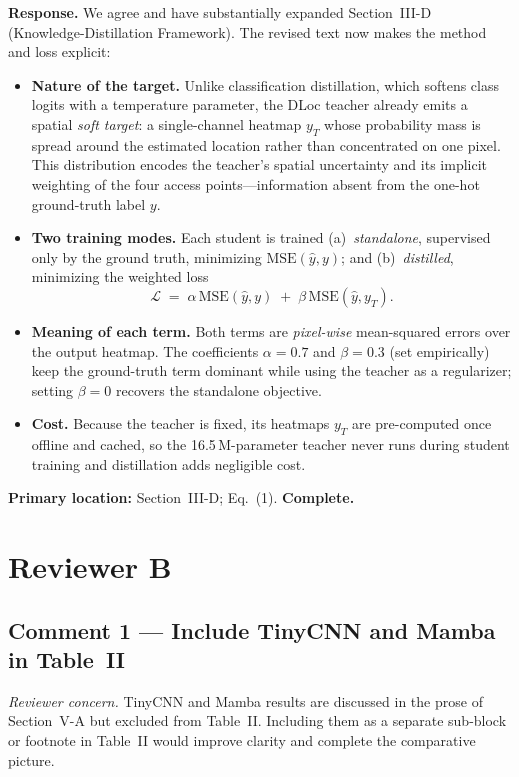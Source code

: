 \documentclass[11pt]{article}
\newcommand{\status}[1]{\textbf{\color{okgreen}#1}}
\newcommand{\concern}[1]{\textit{Reviewer concern.} #1}
\newcommand{\response}[1]{\textbf{Response.} #1}
\begin{document}
\response{We agree and have substantially expanded Section~III-D (Knowledge-Distillation Framework).} The revised text now makes the method and loss explicit:
\begin{itemize}[leftmargin=1.4em,itemsep=1pt,topsep=2pt]
  \item \textbf{Nature of the target.} Unlike classification distillation, which softens class logits with a temperature parameter, the DLoc teacher already emits a spatial \emph{soft target}: a single-channel heatmap $y_T$ whose probability mass is spread around the estimated location rather than concentrated on one pixel. This distribution encodes the teacher's spatial uncertainty and its implicit weighting of the four access points---information absent from the one-hot ground-truth label $y$.
  \item \textbf{Two training modes.} Each student is trained (a)~\emph{standalone}, supervised only by the ground truth, minimizing $\mathrm{MSE}(\hat{y},y)$; and (b)~\emph{distilled}, minimizing the weighted loss
  \[ \mathcal{L} \;=\; \alpha\,\mathrm{MSE}(\hat{y},y) \;+\; \beta\,\mathrm{MSE}(\hat{y},y_T). \]
  \item \textbf{Meaning of each term.} Both terms are \emph{pixel-wise} mean-squared errors over the output heatmap. The coefficients $\alpha{=}0.7$ and $\beta{=}0.3$ (set empirically) keep the ground-truth term dominant while using the teacher as a regularizer; setting $\beta{=}0$ recovers the standalone objective.
  \item \textbf{Cost.} Because the teacher is fixed, its heatmaps $y_T$ are pre-computed once offline and cached, so the 16.5\,M-parameter teacher never runs during student training and distillation adds negligible cost.
\end{itemize}
\textbf{Primary location:} Section~III-D; Eq.~(1). \hfill \status{Complete.}

\section{Reviewer B}

\subsection{Comment 1 --- Include TinyCNN and Mamba in Table~II}
\concern{TinyCNN and Mamba results are discussed in the prose of Section~V-A but excluded from Table~II. Including them as a separate sub-block or footnote in Table~II would improve clarity and complete the comparative picture.}
\end{document}
